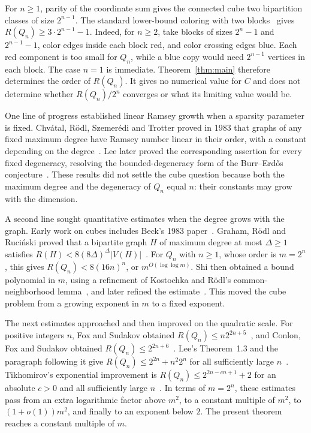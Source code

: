 For $n\ge1$, parity of the coordinate sum gives the connected cube two
bipartition classes of size $2^{n-1}$. The standard lower-bound coloring
with two blocks~\cite[Introduction]{conlon-fox-lee-sudakov2016} gives
$R(Q_n)\ge3\cdot2^{n-1}-1$. Indeed, for $n\ge2$, take blocks of sizes
$2^n-1$ and $2^{n-1}-1$, color edges inside each block red, and color
crossing edges blue. Each red component is too small for $Q_n$, while a
blue copy would need $2^{n-1}$ vertices in each block. The case $n=1$ is
immediate. Theorem~\ref{thm:main} therefore determines the order of
$R(Q_n)$. It gives no numerical value for $C$ and does not determine
whether $R(Q_n)/2^n$ converges or what its limiting value would be.

One line of progress established linear Ramsey growth when a sparsity
parameter is fixed. Chv\'atal, R\"odl, Szemer\'edi and Trotter proved in
1983 that graphs of any fixed maximum degree have Ramsey number linear in
their order, with a constant depending on the degree~\cite{chvatal-rodl-szemeredi-trotter1983}.
Lee later proved the
corresponding assertion for every fixed degeneracy, resolving the
bounded-degeneracy form of the Burr--Erd\H{o}s conjecture~\cite[Theorem~1.1]{lee2017}.
These results did not settle the cube question
because both the maximum degree and the degeneracy of $Q_n$ equal $n$:
their constants may grow with the dimension.

A second line sought quantitative estimates when the degree grows with
the graph. Early work on cubes includes Beck's 1983 paper~\cite{beck1983}.
Graham, R\"odl and Ruci\'nski proved that a bipartite graph $H$ of maximum
degree at most $\Delta\ge1$ satisfies
$R(H)<8(8\Delta)^\Delta |V(H)|$~\cite[Theorem~1]{graham-rodl-rucinski2001}.
For $Q_n$ with $n\ge1$, whose order is $m=2^n$, this gives $R(Q_n)<8(16n)^n$, or
$m^{O(\log\log m)}$. Shi then obtained a bound polynomial in $m$, using a
refinement of Kostochka and R\"odl's common-neighborhood lemma~\cite{kostochka-rodl2001,shi2001},
and later refined the estimate~\cite{shi2007}. This moved the cube problem from a growing exponent in
$m$ to a fixed exponent.

The next estimates approached and then improved on the quadratic scale.
For positive integers $n$, Fox and Sudakov obtained
$R(Q_n)\le n2^{2n+5}$~\cite[Corollary~1.3]{fox-sudakov2009}, and Conlon,
Fox and Sudakov obtained
$R(Q_n)\le2^{2n+6}$~\cite[Corollary~4.2]{conlon-fox-sudakov2016}.
Lee's Theorem~1.3 and the paragraph following it give
$R(Q_n)\le2^{2n}+n^2 2^n$ for all sufficiently large $n$~\cite{lee2017}.
Tikhomirov's exponential improvement is
$R(Q_n)\le2^{2n-cn+1}+2$ for an absolute $c>0$ and all sufficiently large
$n$~\cite[Corollary~1.2]{tikhomirov2024}.
In terms of $m=2^n$, these estimates pass from an extra logarithmic factor
above $m^2$, to a constant multiple of $m^2$, to $(1+o(1))m^2$, and
finally to an exponent below $2$. The present theorem reaches a constant
multiple of $m$.

